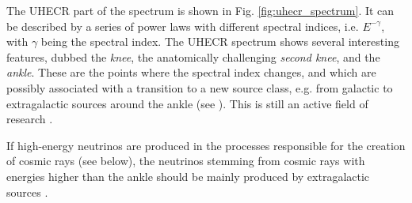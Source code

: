 \documentclass[
    a4paper, %
    fontsize=10pt, %
    twoside=false, %
    numbers=noenddot, %
    fontmethod=tex,
]{kaobook}
\begin{document}
The UHECR part of the spectrum is shown in Fig. \ref{fig:uhecr_spectrum}. It can be described by a series of power laws with different spectral indices, i.e. $E^{-\gamma}$, with $\gamma$ being the spectral index. The UHECR spectrum shows several interesting features, dubbed the \textit{knee}, the anatomically challenging \textit{second knee}, and the \textit{ankle}. These are the points where the spectral index changes, and which are possibly associated with a transition to a new source class, e.g. from galactic to extragalactic sources around the ankle (see ). This is still an active field of research \cite{Workman2022}.

If high-energy neutrinos are produced in the processes responsible for the creation of cosmic rays (see below), the neutrinos stemming from cosmic rays with energies higher than the ankle should be mainly produced by extragalactic sources .
\end{document}
